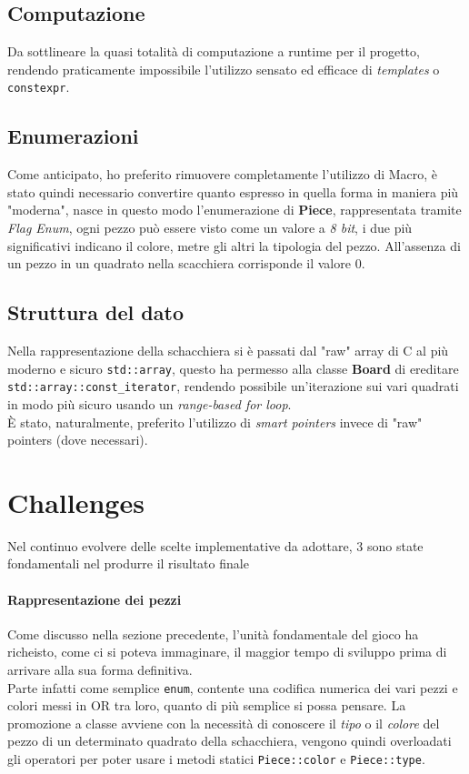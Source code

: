 \documentclass{article}
\begin{document}
        \subsection{Computazione}\label{subsec:computation}
            Da sottlineare la quasi totalità di computazione a runtime per il progetto, rendendo praticamente impossibile l'utilizzo sensato ed efficace di \textit{templates} o \texttt{constexpr}.
        \subsection{Enumerazioni}\label{subsec:enum}
            Come anticipato, ho preferito rimuovere completamente l'utilizzo di Macro, è stato quindi necessario convertire quanto espresso in quella forma in maniera più "moderna", nasce in questo modo l'enumerazione di \textbf{Piece}, rappresentata tramite \textit{Flag Enum}, ogni pezzo può essere visto come un valore a \textit{8 bit}, i due più significativi indicano il colore, metre gli altri la tipologia del pezzo.
            All'assenza di un pezzo in un quadrato nella scacchiera corrisponde il valore 0.
        \subsection{Struttura del dato}\label{subsec:datastruct}
            Nella rappresentazione della schacchiera si è passati dal "raw" array di C al più moderno e sicuro \texttt{std::array}, questo ha permesso alla classe \textbf{Board} di ereditare \texttt{std::array::const\_iterator}, rendendo possibile un'iterazione sui vari quadrati in modo più sicuro usando un \textit{range-based for loop}.\\
            È stato, naturalmente, preferito l'utilizzo di \textit{smart pointers} invece di "raw" pointers (dove necessari).
    \newpage
    \section{Challenges}\label{sec:challenges}
        Nel continuo evolvere delle scelte implementative da adottare, 3 sono state fondamentali nel produrre il risultato finale
        \paragraph{Rappresentazione dei pezzi}
            Come discusso nella sezione precedente, l'unità fondamentale del gioco ha richeisto, come ci si poteva immaginare, il maggior tempo di sviluppo prima di arrivare alla sua forma definitiva.\\
            Parte infatti come semplice \texttt{enum}, contente una codifica numerica dei vari pezzi e colori messi in OR tra loro, quanto di più semplice si possa pensare. La promozione a classe avviene con la necessità di conoscere il \textit{tipo} o il \textit{colore} del pezzo di un determinato quadrato della schacchiera, vengono quindi overloadati gli operatori per poter usare i metodi statici \texttt{Piece::color} e \texttt{Piece::type}.
\end{document}
